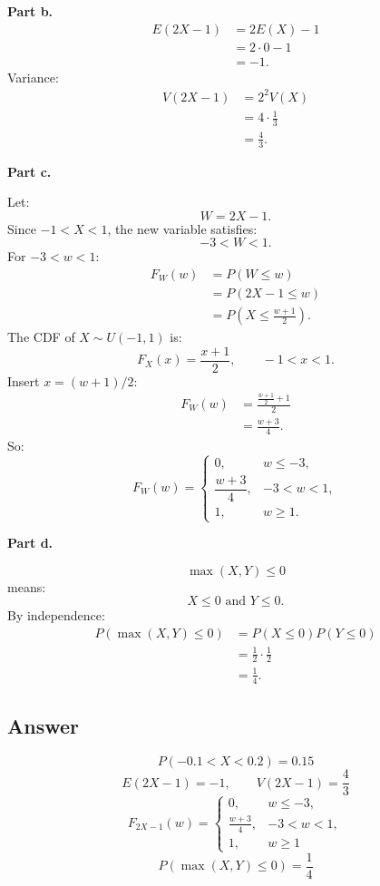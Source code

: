 \documentclass[11pt,a4paper]{article}
\begin{document}
\textbf{Part b.}
\begin{align*}
E(2X-1)
&=2E(X)-1\\
&=2\cdot 0-1\\
&=-1.
\end{align*}
Variance:
\begin{align*}
V(2X-1)
&=2^2V(X)\\
&=4\cdot \frac{1}{3}\\
&=\frac{4}{3}.
\end{align*}

\textbf{Part c.}

Let:
\[
W=2X-1.
\]
Since \(-1<X<1\), the new variable satisfies:
\[
-3<W<1.
\]
For \(-3<w<1\):
\begin{align*}
F_W(w)
&=P(W\le w)\\
&=P(2X-1\le w)\\
&=P\left(X\le \frac{w+1}{2}\right).
\end{align*}
The CDF of \(X\sim U(-1,1)\) is:
\[
F_X(x)=\frac{x+1}{2},\qquad -1<x<1.
\]
Insert \(x=(w+1)/2\):
\begin{align*}
F_W(w)
&=\frac{\frac{w+1}{2}+1}{2}\\
&=\frac{w+3}{4}.
\end{align*}
So:
\[
F_W(w)=
\begin{cases}
0, & w\le -3,\\
\dfrac{w+3}{4}, & -3<w<1,\\
1, & w\ge 1.
\end{cases}
\]

\textbf{Part d.}

\[
\max(X,Y)\le 0
\]
means:
\[
X\le 0 \text{ and } Y\le 0.
\]
By independence:
\begin{align*}
P(\max(X,Y)\le 0)
&=P(X\le 0)P(Y\le 0)\\
&=\frac{1}{2}\cdot \frac{1}{2}\\
&=\frac{1}{4}.
\end{align*}

\subsection*{Answer}
\[
\boxed{P(-0.1<X<0.2)=0.15}
\]
\[
\boxed{E(2X-1)=-1,\qquad V(2X-1)=\frac{4}{3}}
\]
\[
\boxed{
F_{2X-1}(w)=
\begin{cases}
0, & w\le -3,\\
\frac{w+3}{4}, & -3<w<1,\\
1, & w\ge 1
\end{cases}}
\]
\[
\boxed{P(\max(X,Y)\le 0)=\frac{1}{4}}
\]
\end{document}
